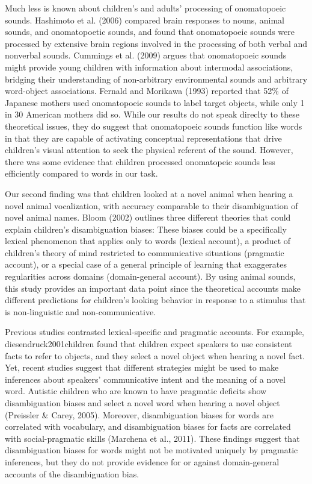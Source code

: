 \documentclass[english,floatsintext,man]{apa6}
\theoremstyle{definition}
\theoremstyle{definition}
\theoremstyle{definition}
\theoremstyle{remark}
\begin{document}
Much less is known about children's and adults' processing of
onomatopoeic sounds. Hashimoto et al. (2006) compared brain responses to
nouns, animal sounds, and onomatopoetic sounds, and found that
onomatopoeic sounds were processed by extensive brain regions involved
in the processing of both verbal and nonverbal sounds. Cummings et al.
(2009) argues that onomatopoeic sounds might provide young children with
information about intermodal associations, bridging their understanding
of non-arbitrary environmental sounds and arbitrary word-object
associations. Fernald and Morikawa (1993) reported that 52\% of Japanese
mothers used onomatopoeic sounds to label target objects, while only 1
in 30 American mothers did so. While our results do not speak direclty
to these theoretical issues, they do suggest that onomatopoeic sounds
function like words in that they are capable of activating conceptual
representations that drive children's visual attention to seek the
physical referent of the sound. However, there was some evidence that
children processed onomatopeic sounds less efficiently compared to words
in our task.

Our second finding was that children looked at a novel animal when
hearing a novel animal vocalization, with accuracy comparable to their
disambiguation of novel animal names. Bloom (2002) outlines three
different theories that could explain children's disambiguation biases:
These biases could be a specifically lexical phenomenon that applies
only to words (lexical account), a product of children's theory of mind
restricted to communicative situations (pragmatic account), or a special
case of a general principle of learning that exaggerates regularities
across domains (domain-general account). By using animal sounds, this
study provides an important data point since the theoretical accounts
make different predictions for children's looking behavior in response
to a stimulus that is non-linguistic and non-communicative.

Previous studies contrasted lexical-specific and pragmatic accounts. For
example, diesendruck2001children found that children expect speakers to
use consistent facts to refer to objects, and they select a novel object
when hearing a novel fact. Yet, recent studies suggest that different
strategies might be used to make inferences about speakers'
communicative intent and the meaning of a novel word. Autistic children
who are known to have pragmatic deficits show disambiguation biases and
select a novel word when hearing a novel object (Preissler \& Carey,
2005). Moreover, disambiguation biases for words are correlated with
vocabulary, and disambiguation biases for facts are correlated with
social-pragmatic skills (Marchena et al., 2011). These findings suggest
that disambiguation biases for words might not be motivated uniquely by
pragmatic inferences, but they do not provide evidence for or against
domain-general accounts of the disambiguation bias.
\end{document}
